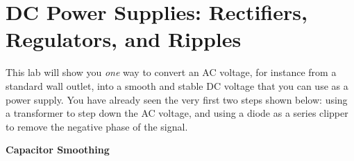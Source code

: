 \section{DC Power Supplies: Rectifiers, Regulators, and Ripples}
\label{lab_power_supply}



This lab will show you  \textit{one} way to convert an AC voltage, for instance from a standard wall outlet, into a smooth and stable DC voltage that you can use as a power supply.  You have already seen the very first two steps shown below: using a transformer to step down the AC voltage, and using a diode as a series clipper to remove the negative phase of the signal.   

\medskip
\textbf{Capacitor Smoothing}

